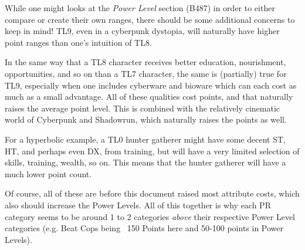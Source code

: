 \begin{multicols}{2}
	While one might looks at the \textit{Power Level} section (B487) in order to either compare or create their own ranges, there should be some additional concerns to keep in mind! TL9, even in a cyberpunk dystopia, will naturally have higher point ranges than one's intuition of TL8. 
	
	In the same way that a TL8 character receives better education, nourishment, opportunities, and so on than a TL7 character, the same is (partially) true for TL9, especially when one includes cyberware and bioware which can each cost as much as a small advantage. All of these qualities cost points, and that naturally raises the average point level. This is combined with the relatively cinematic world of Cyberpunk and Shadowrun, which naturally raises the points as well.
	
	For a hyperbolic example, a TL0 hunter gatherer might have some decent ST, HT, and perhaps even DX, from training, but will have a very limited selection of skills, training, wealth, so on. This means that the hunter gatherer will have a much lower point count.	
	 
	 Of course, all of these are before this document raised most attribute costs, which also should increase the Power Levels. All of this together is why each PR category seems to be around 1 to 2 categories \textit{above} their respective Power Level categories (e.g. Beat Cops being ~150 Points here and 50-100 points in Power Levels).
	

\end{multicols}
